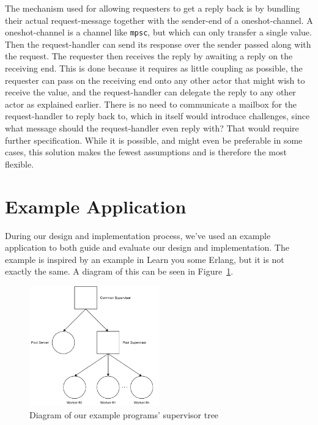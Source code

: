 \documentclass[a4paper]{article}
\newcommand\figref[1]{Figure~\ref{#1}}
\begin{document}
\begin{itemize}
  The mechanism used for allowing requesters to get a reply back is by bundling
  their actual request-message together with the sender-end of a
  oneshot-channel. A oneshot-channel is a channel like \texttt{mpsc}, but which
  can only transfer a single value. Then the request-handler can send its
  response over the sender passed along with the request. The requester then
  receives the reply by awaiting a reply on the receiving end. This is done because
  it requires as little coupling as possible, the requester can pass on the
  receiving end onto any other actor that might wish to receive the value, and
  the request-handler can delegate the reply to any other actor as explained
  earlier. There is no need to communicate a mailbox for the request-handler to
  reply back to, which in itself would introduce challenges, since what message
  should the request-handler even reply with? That would require further
  specification. While it is possible, and might even be preferable in some
  cases, this solution makes the fewest assumptions and is therefore the most
  flexible.

\end{itemize}
\section{Example Application}
During our design and implementation process, we've used an example application
to both guide and evaluate our design and implementation. The example is
inspired by an example in Learn you some Erlang\cite{LYSE}, but it is not
exactly the same. A diagram of this can be seen in \figref{fig:example_diagram}.

\begin{figure}[h!]
  \centering
  \includegraphics[width=0.5\textwidth]{./resources/PoolDiagram.pdf}
  \caption{Diagram of our example programs' supervisor tree}
  \label{fig:example_diagram}
\end{figure}
\end{document}
